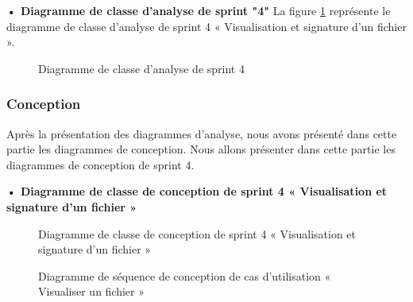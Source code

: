 \textbf{•	Diagramme de classe d'analyse de sprint "4" }
La figure \ref{fig:class_analyse_4} représente le diagramme de classe d'analyse de sprint 4 « Visualisation et signature d'un fichier ».

\begin{figure}[H]
  \centering
  \caption{Diagramme de classe d'analyse de sprint 4}
  \label{fig:class_analyse_4}
\end{figure}



\subsubsection{Conception}

Après la présentation des diagrammes d'analyse, nous avons présenté dans cette partie les diagrammes de conception.
Nous allons présenter dans cette partie les diagrammes de conception de sprint 4.
\newpage 
\begin{landscape}

\textbf{•	Diagramme de classe de conception de sprint 4 « Visualisation et signature d'un fichier »}

\begin{figure}[H]
  \centering
  \caption{Diagramme de classe de conception de sprint 4 « Visualisation et signature d'un fichier »}
  \label{fig:class_diagram_4}
\end{figure}
\end{landscape}
\newpage


\begin{figure}[H]
  \centering
  \caption{Diagramme de séquence de conception de cas d'utilisation « Visualiser un fichier »}
  \label{fig:sequence_conception_view_file}
\end{figure}


